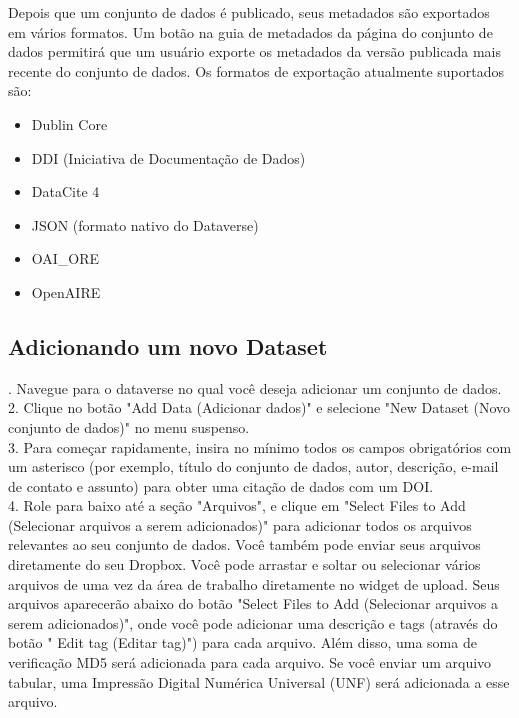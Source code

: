 \documentclass[12pt,hidelinks]{article}
\begin{document}
\qquad Depois que um conjunto de dados é publicado, seus metadados são exportados em vários formatos. Um botão na guia de metadados da página do conjunto de dados permitirá que um usuário exporte os metadados da versão publicada mais recente do conjunto de dados. Os formatos de exportação atualmente suportados são:

\begin{itemize}

 \item Dublin Core
 \item DDI (Iniciativa de Documentação de Dados)
 \item DataCite 4
 \item JSON (formato nativo do Dataverse)
 \item OAI\_ORE
 \item OpenAIRE

\end{itemize}
        
    \subsection{Adicionando um novo Dataset}
    
. Navegue para o dataverse no qual você deseja adicionar um conjunto de dados.\\

2. Clique no botão "Add Data (Adicionar dados)" e selecione "New Dataset (Novo conjunto de dados)" no menu suspenso.\\

3. Para começar rapidamente, insira no mínimo todos os campos obrigatórios com um asterisco (por exemplo, título do conjunto de dados, autor, descrição, e-mail de contato e assunto) para obter uma citação de dados com um DOI.\\

4. Role para baixo até a seção "Arquivos", e clique em "Select Files to Add (Selecionar arquivos a serem adicionados)" para adicionar todos os arquivos relevantes ao seu conjunto de dados. Você também pode enviar seus arquivos diretamente do seu Dropbox. Você pode arrastar e soltar ou selecionar vários arquivos de uma vez da área de trabalho diretamente no widget de upload. Seus arquivos aparecerão abaixo do botão "Select Files to Add (Selecionar arquivos a serem adicionados)", onde você pode adicionar uma descrição e tags (através do botão " Edit tag (Editar tag)") para cada arquivo. Além disso, uma soma de verificação MD5 será adicionada para cada arquivo. Se você enviar um arquivo tabular, uma Impressão Digital Numérica Universal (UNF) será adicionada a esse arquivo.\\
\end{document}
